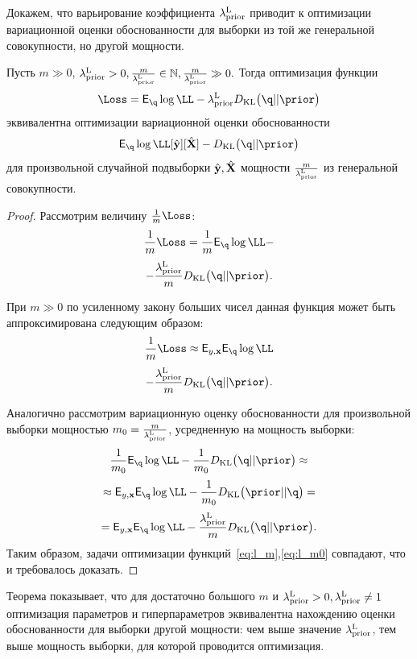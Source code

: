 Докажем, что варьирование коэффициента $\lambda_\text{prior}^\text{L}$ приводит к оптимизации вариационной оценки обоснованности для выборки из той же генеральной совокупности, но другой мощности.
\begin{theorem}
\label{th:elbo_size}
Пусть $m \gg 0$, $\lambda_\text{prior}^\text{L} > 0, \frac{m}{\lambda_\text{prior}^\text{L}}   \in \mathbb{N}, \frac{m}{\lambda_\text{prior}^\text{L}}  \gg 0.$ Тогда оптимизация функции
\[
\Loss = \E_{\q} \log \LL - \lamCL\KL{\q}{\prior}
\]
 эквивалентна оптимизации вариационной оценки обоснованности  $$\E_{\q} \log \LL[\hat{\y}][\hat{\X}] - \KL{\q}{\prior}$$
для произвольной случайной подвыборки $\hat{\mathbf{y}}, \hat{\mathbf{X}}$ мощности $\frac{m}{{\lambda_\text{prior}^\text{L}}}$ из генеральной совокупности.
\end{theorem}

\begin{proof}
Рассмотрим величину  $\frac{1}{m}\Loss$: \\
\begin{equation}
\label{eq:l_m}
    \frac{1}{m}\Loss = \frac{1}{m}\E_{\q} \log \LL -
\end{equation}
\[
- \frac{\lamCL}{m}\KL{\q}{\prior}.
\]

При $m \gg 0$ по усиленному закону больших чисел данная функция может быть аппроксимирована следующим образом:
\[
    \frac{1}{m}\Loss \approx  \E_{y,\x} \E_{\q} \log \LL 
\]
\[
-\frac{\lamCL}{m}\KL{\q}{\prior}.
\]

Аналогично рассмотрим вариационную оценку обоснованности для произвольной выборки мощностью $m_0 = \frac{m}{\lambda_\text{prior}^\text{L}}$, усредненную на мощность выборки:
\begin{equation}
\label{eq:l_m0}
    \frac{1}{m_0}\E_{\q} \log \LL - \frac{1}{m_0} \KL{\q}{\prior} \approx
\end{equation}
\[
\approx  \E_{y,\x} \E_{\q} \log \LL  -\frac{1}{m_0}\KL{\prior}{\q}= 
\]
\[
= \E_{y,\x} \E_{\q} \log \LL  -\frac{\lamCL}{m}\KL{\q}{\prior}.
\]
Таким образом, задачи оптимизации функций~\eqref{eq:l_m},\eqref{eq:l_m0} совпадают, что и требовалось доказать.
\end{proof}
Теорема показывает, что для достаточно большого $m$ и $\lambda_\text{prior}^\text{L}>0, \lambda_\text{prior}^\text{L} \neq 1$ оптимизация параметров и гиперпараметров эквивалентна нахождению оценки обоснованности для выборки другой мощности: чем выше значение $ \lambda_\text{prior}^\text{L}$, тем выше мощность выборки, для которой проводится оптимизация.



